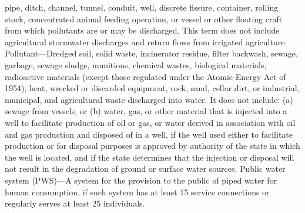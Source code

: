 \documentclass{article}
\begin{document}
pipe, ditch, channel, tunnel, conduit, well, discrete fissure,
container, rolling stock, concentrated animal feeding operation, or
vessel or other floating craft from which pollutants are or may be
discharged. This term does not include agricultural stormwater
discharges and return flows from irrigated agriculture.
Pollutant---Dredged soil, solid waste, incinerator residue, filter
backwash, sewage, garbage, sewage sludge, munitions, chemical wastes,
biological materials, radioactive materials (except those regulated
under the Atomic Energy Act of 1954), heat, wrecked or discarded
equipment, rock, sand, cellar dirt, or industrial, municipal, and
agricultural waste discharged into water. It does not include: (a)
sewage from vessels, or (b) water, gas, or other material that is
injected into a well to facilitate production of oil or gas, or water
derived in association with oil and gas production and disposed of in a
well, if the well used either to facilitate production or for disposal
purposes is approved by authority of the state in which the well is
located, and if the state determines that the injection or disposal will
not result in the degradation of ground or surface water sources. Public
water system (PWS)---A system for the provision to the public of piped
water for human consumption, if such system has at least 15 service
connections or regularly serves at least 25 individuals.
\end{document}
